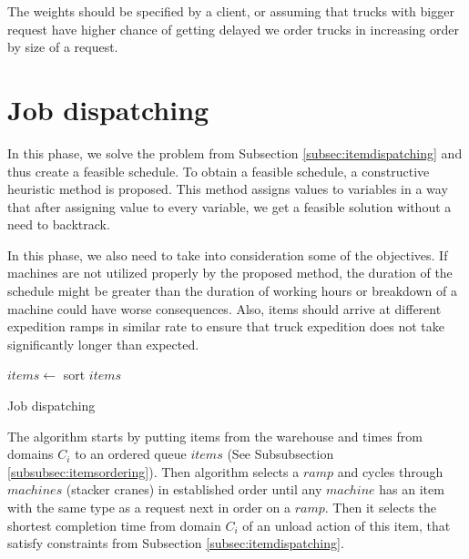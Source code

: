 \documentclass{ctuthesis}
\begin{document}
The weights should be specified by a client, or assuming that trucks with bigger request have higher chance of getting delayed we order trucks in increasing order by size of a request.

\section{Job dispatching}

In this phase, we solve the problem from Subsection \ref{subsec:itemdispatching} and thus create a feasible schedule.
To obtain a feasible schedule, a constructive heuristic method is proposed. This method assigns values to variables in a way that after assigning value to every variable, we get a feasible solution without a need to backtrack.

In this phase, we also need to take into consideration some of the objectives. If machines are not utilized properly by the proposed method, the duration of the schedule might be greater than the duration of working hours or breakdown of a machine could have worse consequences. Also, items should arrive at different expedition ramps in similar rate to ensure that truck expedition does not take significantly longer than expected.
 
\begin{algorithm}[H]
\SetAlgoLined
{}
  $items \leftarrow$ sort $items$\;
\caption{Job dispatching}
\end{algorithm}

The algorithm starts by putting items from the warehouse and times from domains $C_i$ to an ordered queue $items$ (See Subsubsection \ref{subsubsec:itemsordering}). Then algorithm selects a $ramp$ and cycles through $machines$ (stacker cranes) in established order until any $machine$ has an item with the same type as a request next in order on a $ramp$. Then it selects the shortest completion time from domain $C_i$ of an unload action of this item, that satisfy constraints from Subsection \ref{subsec:itemdispatching}. 
\end{document}
